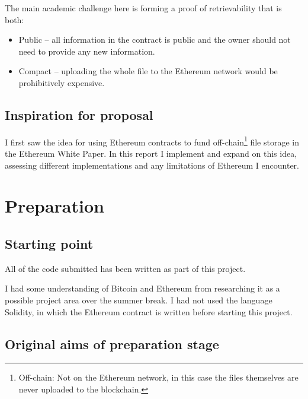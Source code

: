 \documentclass[12pt,a4paper,twoside,openright]{report}
\begin{document}
\vspace{1em}
The main academic challenge here is forming a proof of retrievability that is both:
\begin{itemize}
\item Public -- all information in the contract is public and the owner should not need to provide any new information.
\item Compact -- uploading the whole file to the Ethereum network would be prohibitively expensive.
\end{itemize}


\section{Inspiration for proposal}

I first saw the idea for using Ethereum contracts to fund off-chain\footnote{Off-chain: Not on the Ethereum network,
in this case the files themselves are never uploaded to the blockchain.} file storage
in the Ethereum White Paper\cite{eth-whitepaper}. 
In this report I implement and expand on this idea, assessing different implementations and any limitations of Ethereum I encounter.





\chapter{Preparation}

\section{Starting point}

All of the code submitted has been written as part of this project.

I had some understanding of Bitcoin and Ethereum from researching it as a possible project area over the summer break.
I had not used the language Solidity, in which the Ethereum contract is written before starting this project.

\section{Original aims of preparation stage}
\end{document}
